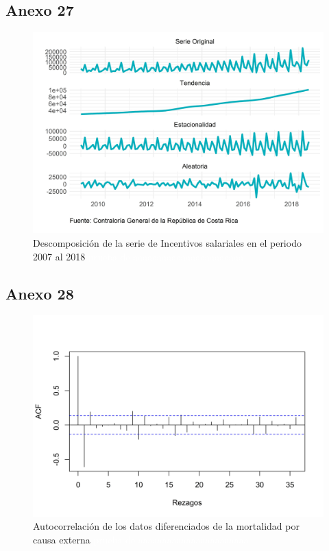 \documentclass[
]{article}
\begin{document}
\subsection{Anexo 27}

\begin{figure}[H]
\includegraphics[width=1\linewidth,height=1\textheight]{Tesis_files/figure-latex/interesesplotdescomposicion-1} \caption{Descomposición de la serie de Incentivos salariales en el periodo 2007 al 2018 \textcolor{white}{prueba de aaaaaaaaaaaaaaaaaaaaaaa}}\label{fig:interesesplotdescomposicion}
\end{figure}

\subsection{Anexo 28}

\begin{figure}[H]
\includegraphics[width=1\linewidth,height=1\textheight]{Tesis_files/figure-latex/externa_acf-1} \caption{Autocorrelación de los datos diferenciados de la mortalidad por causa externa \textcolor{white}{prueba de aaaaaaaaaaaaaaaaaaaaaaa}}\label{fig:externa_acf}
\end{figure}
\end{document}
